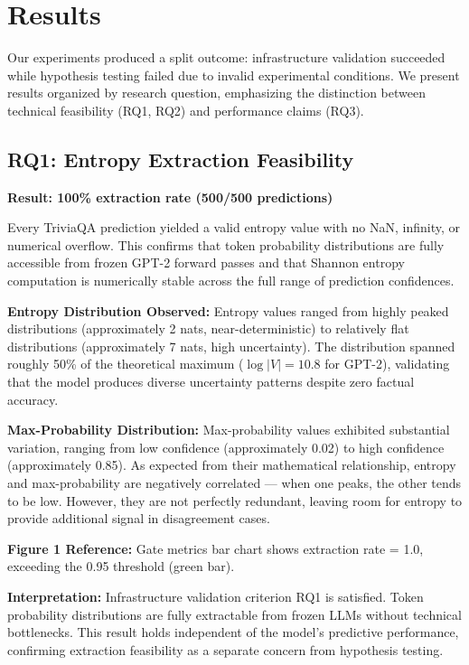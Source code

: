 \section{Results}

Our experiments produced a split outcome: infrastructure validation succeeded while hypothesis testing failed due to invalid experimental conditions. We present results organized by research question, emphasizing the distinction between technical feasibility (RQ1, RQ2) and performance claims (RQ3).

\subsection{RQ1: Entropy Extraction Feasibility}

\textbf{Result: 100\% extraction rate (500/500 predictions)}

Every TriviaQA prediction yielded a valid entropy value with no NaN, infinity, or numerical overflow. This confirms that token probability distributions are fully accessible from frozen GPT-2 forward passes and that Shannon entropy computation is numerically stable across the full range of prediction confidences.

\textbf{Entropy Distribution Observed:}
Entropy values ranged from highly peaked distributions (approximately 2 nats, near-deterministic) to relatively flat distributions (approximately 7 nats, high uncertainty). The distribution spanned roughly 50\% of the theoretical maximum ($\log|V| = 10.8$ for GPT-2), validating that the model produces diverse uncertainty patterns despite zero factual accuracy.

\textbf{Max-Probability Distribution:}
Max-probability values exhibited substantial variation, ranging from low confidence (approximately 0.02) to high confidence (approximately 0.85). As expected from their mathematical relationship, entropy and max-probability are negatively correlated --- when one peaks, the other tends to be low. However, they are not perfectly redundant, leaving room for entropy to provide additional signal in disagreement cases.

\textbf{Figure 1 Reference:} Gate metrics bar chart shows extraction rate = 1.0, exceeding the 0.95 threshold (green bar).

\textbf{Interpretation:} Infrastructure validation criterion RQ1 is satisfied. Token probability distributions are fully extractable from frozen LLMs without technical bottlenecks. This result holds independent of the model's predictive performance, confirming extraction feasibility as a separate concern from hypothesis testing.

